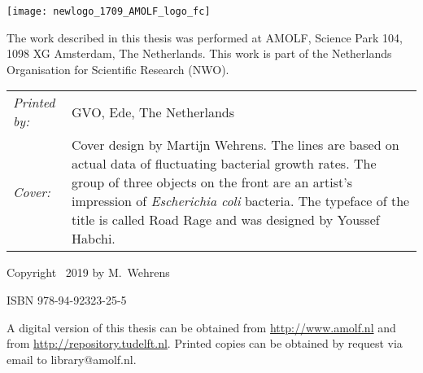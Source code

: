 \begin{titlepage}
\begin{tabular}{p{4cm}l}
      
\end{tabular}



\vfill

\texttt{[image: newlogo\_1709\_AMOLF\_logo\_fc]}


\noindent The work described in this thesis was performed at AMOLF, Science Park 104, 1098 XG Amsterdam, The Netherlands.
This work is part of the Netherlands Organisation for \mbox{Scientific} Research (NWO).

\vspace{2\bigskipamount}

\noindent
\begin{tabular}{@{}p{}@{}p{}}
    \textit{Printed by:} & GVO, Ede, The Netherlands \\[\medskipamount]
    \textit{Cover:} & Cover design by Martijn Wehrens. The lines are based on actual data of fluctuating bacterial growth rates. The group of three objects on the front are an artist's impression of \textit{Escherichia coli} bacteria. The typeface of the title is called Road Rage and was designed by Youssef Habchi.
\end{tabular}

\vspace{2\bigskipamount} %

\noindent Copyright \textcopyright\ 2019 by M.~Wehrens



\medskip
\noindent ISBN 978-94-92323-25-5

\medskip
\noindent A digital version of this thesis can be obtained from \url{http://www.amolf.nl} and from \url{http://repository.tudelft.nl}. Printed copies can be obtained by request via email to library@amolf.nl.


\end{titlepage}

